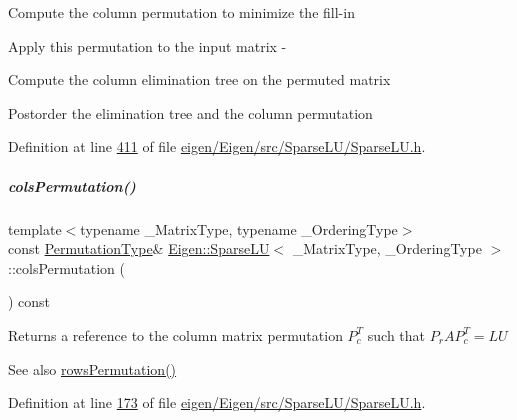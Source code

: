 Compute the column permutation to minimize the fill-\/in


\begin{DoxyItemize}
\item Apply this permutation to the input matrix -\/
\item Compute the column elimination tree on the permuted matrix
\item Postorder the elimination tree and the column permutation 
\end{DoxyItemize}

Definition at line \hyperlink{eigen_2_eigen_2src_2_sparse_l_u_2_sparse_l_u_8h_source_l00411}{411} of file \hyperlink{eigen_2_eigen_2src_2_sparse_l_u_2_sparse_l_u_8h_source}{eigen/\+Eigen/src/\+Sparse\+L\+U/\+Sparse\+L\+U.\+h}.

\mbox{\label{group___sparse_l_u___module_ab7b0d15d0d9fd1faa164298f92ca59cd}} 
\subparagraph{\texorpdfstring{cols\+Permutation()}{colsPermutation()}\hspace{0.1cm}{\footnotesize\ttfamily [1/2]}}
{\footnotesize\ttfamily template$<$typename \+\_\+\+Matrix\+Type, typename \+\_\+\+Ordering\+Type$>$ \\
const \hyperlink{group___core___module}{Permutation\+Type}\& \hyperlink{group___sparse_l_u___module_class_eigen_1_1_sparse_l_u}{Eigen\+::\+Sparse\+LU}$<$ \+\_\+\+Matrix\+Type, \+\_\+\+Ordering\+Type $>$\+::cols\+Permutation (\begin{DoxyParamCaption}{ }\end{DoxyParamCaption}) const\hspace{0.3cm}{\ttfamily [inline]}}

\begin{DoxyReturn}{Returns}
a reference to the column matrix permutation $ P_c^T $ such that $P_r A P_c^T = L U$ 
\end{DoxyReturn}
\begin{DoxySeeAlso}{See also}
\hyperlink{group___sparse_l_u___module_a691295e65c06df599876d78ac2c7fada}{rows\+Permutation()} 
\end{DoxySeeAlso}


Definition at line \hyperlink{eigen_2_eigen_2src_2_sparse_l_u_2_sparse_l_u_8h_source_l00173}{173} of file \hyperlink{eigen_2_eigen_2src_2_sparse_l_u_2_sparse_l_u_8h_source}{eigen/\+Eigen/src/\+Sparse\+L\+U/\+Sparse\+L\+U.\+h}.


